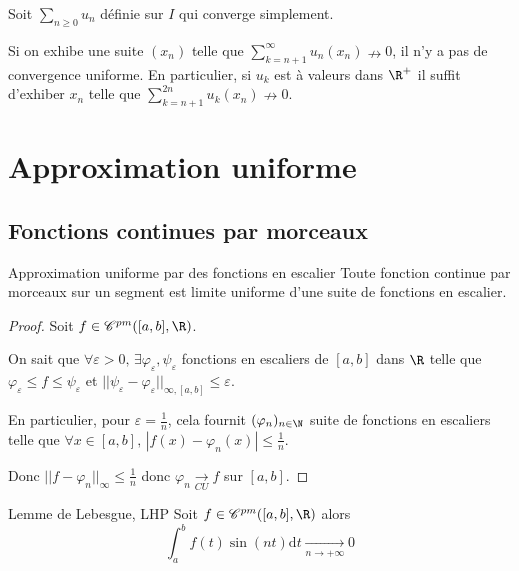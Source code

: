 \begin{proposition}{}{}
    Soit $\sum_{n \geqslant 0} u_n$ définie sur $I$ qui converge simplement. 

    Si on exhibe une suite $(x_n)$ telle que $\displaystyle \sum_{k = n + 1 }^{\infty  } u_n(x_n) \nrightarrow 0$,
    il n'y a pas de convergence uniforme. En particulier, si $u_k$ est à valeurs dans $\R^+$ il suffit 
    d'exhiber $x_n$ telle que $\displaystyle \sum_{k = n + 1}^{2n} u_k(x_n) \nrightarrow 0$.
\end{proposition}


\section{Approximation uniforme }
\subsection{Fonctions continues par morceaux }

\begin{theorement}{Approximation uniforme par des fonctions en escalier}{}
    Toute fonction continue par morceaux sur un segment est limite uniforme d'une suite 
    de fonctions en escalier. 
\end{theorement}

\begin{proof}
    Soit $f \in \mathscr C^{pm}([a, b], \R)$. 

    On sait que $\forall \varepsilon > 0, \, \exists \varphi_\varepsilon, \psi_\varepsilon$ fonctions en escaliers 
    de $[a, b]$ dans $\R$ telle que $\varphi_\varepsilon \leqslant f \leqslant \psi_\varepsilon$ et
    $||\psi_\varepsilon - \varphi_\varepsilon||_{\infty, [a, b]} \leqslant \varepsilon$.

    En particulier, pour $\varepsilon = \frac 1 n$, cela fournit $(\varphi_n)_{n \in \N}$ suite de 
    fonctions en escaliers telle que $\forall x \in [a, b], \, | f(x) - \varphi_n(x) | \leqslant \frac 1 n$.

    Donc $||f - \varphi_n||_\infty \leqslant \frac 1 n $ donc $\varphi_n \xrightarrow[CU]{} f$ sur $[a, b]$.
\end{proof}


\begin{proposition}{Lemme de Lebesgue, LHP}{}
    Soit $f \in \mathscr C^{pm}([a, b], \R)$ alors 
    $$\int_a^b f(t) \sin(nt) \mathrm d t \xrightarrow[n \to + \infty ]{} 0$$
\end{proposition}

